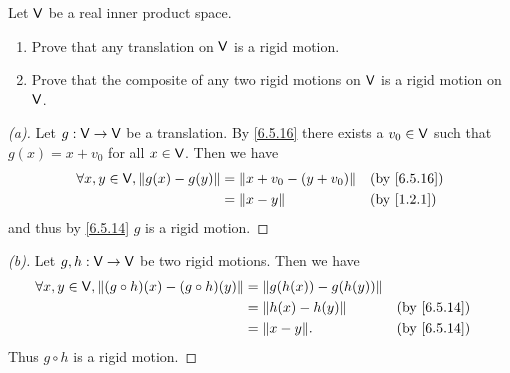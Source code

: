 \begin{ex}\label{ex:6.5.22}
  Let \(\mathsf{V}\) be a real inner product space.
  \begin{enumerate}
    \item Prove that any translation on \(\mathsf{V}\) is a rigid motion.
    \item Prove that the composite of any two rigid motions on \(\mathsf{V}\) is a rigid motion on \(\mathsf{V}\).
  \end{enumerate}
\end{ex}

\begin{proof}[(a)]
  Let \(g : \mathsf{V} \to \mathsf{V}\) be a translation.
  By \cref{6.5.16} there exists a \(v_0 \in \mathsf{V}\) such that \(g(x) = x + v_0\) for all \(x \in \mathsf{V}\).
  Then we have
  \begin{align*}
    \forall x, y \in \V, \norm{g(x) - g(y)} & = \norm{x + v_0 - (y + v_0)} &  & \by{6.5.16} \\
                                            & = \norm{x - y}               &  & \by{1.2.1}
  \end{align*}
  and thus by \cref{6.5.14} \(g\) is a rigid motion.
\end{proof}

\begin{proof}[(b)]
  Let \(g, h: \mathsf{V} \to \mathsf{V}\) be two rigid motions.
  Then we have
  \begin{align*}
    \forall x, y \in \V, \norm{(g \circ h)(x) - (g \circ h)(y)} & = \norm{g(h(x)) - g(h(y))}                  \\
                                                                & = \norm{h(x) - h(y)}       &  & \by{6.5.14} \\
                                                                & = \norm{x - y}.            &  & \by{6.5.14}
  \end{align*}
  Thus \(g \circ h\) is a rigid motion.
\end{proof}
